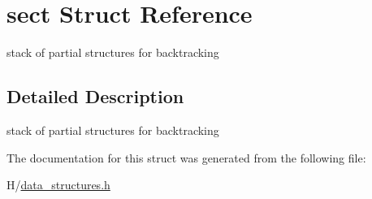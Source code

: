 \hypertarget{structsect}{
\section{sect Struct Reference}
\label{structsect}
}


stack of partial structures for backtracking  




\subsection{Detailed Description}
stack of partial structures for backtracking 

The documentation for this struct was generated from the following file:\begin{DoxyCompactItemize}
\item 
H/\hyperlink{data__structures_8h}{data\_\-structures.h}\end{DoxyCompactItemize}
